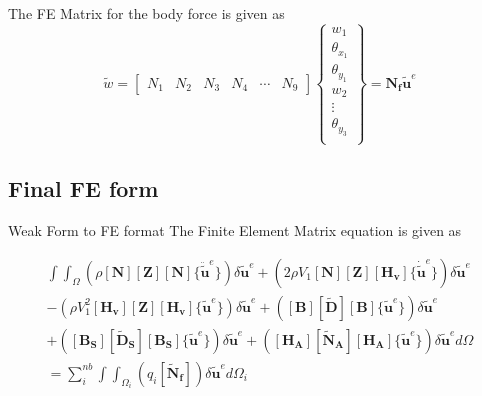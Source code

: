 \documentclass[main.tex]{subfiles}
\begin{document}
The FE Matrix for the body force is given as
\begin{equation}
\tilde{w} = 
\begin{bmatrix}
{N}_{1} & N_{2} & N_{3} &{N}_{4} &\cdots & N_{9} 
\end{bmatrix} 
\left\{
\begin{array}{r}
w_1 \\
\theta_{x_1} \\
\theta_{y_1} \\
w_2 \\
\vdots \\
\theta_{y_{3}} \\
\end{array} \right\}=\mathbf{ N_f }\tilde{\mathbf{u}}^e
\end{equation}


\subsection{Final FE form}
Weak Form to FE format
The Finite Element Matrix equation is given as

\begin{equation*}
\begin{split} 
\int \int_\Omega 
\left(
\rho
\left[ \mathbf{N}  \right]
\left[ \mathbf{Z}  \right]
\left[ \mathbf{N}  \right] 
\{ \ddot{\tilde{\mathbf{u}}}^e \}
\right) 
\delta \tilde{\mathbf{u}}^e
+
\left( 
2 \rho V_1
\left[ \mathbf{N}  \right]
\left[ \mathbf{Z}  \right]
\left[ \mathbf{H_v}  \right] 
\{ \dot{\tilde{\mathbf{u}}}^e \}
\right) 
\delta \tilde{\mathbf{u}}^e \\
-
\left( 
 \rho V_1^2
\left[ \mathbf{H_v}  \right]
\left[ \mathbf{Z}  \right]
\left[ \mathbf{H_v}  \right] 
\{\tilde{\mathbf{u}}^e \}
\right) 
\delta \tilde{\mathbf{u}}^e  
+
\left( 
\left[ \mathbf{B}  \right]
\left[ \mathbf{\tilde{D}}  \right]
\left[ \mathbf{B}  \right] 
\{\tilde{\mathbf{u}}^e \}
\right) 
\delta \tilde{\mathbf{u}}^e  \\
+
\left( 
\left[ \mathbf{B_S}  \right]
\left[ \mathbf{\tilde{D}_S}  \right]
\left[ \mathbf{B_S}  \right] 
\{\tilde{\mathbf{u}}^e \}
\right) 
\delta \tilde{\mathbf{u}}^e
+
\left( 
\left[ \mathbf{H_A}  \right]
\left[ \mathbf{\tilde{N}_A}  \right]
\left[ \mathbf{H_A}  \right] 
\{\tilde{\mathbf{u}}^e \}
\right) 
\delta \tilde{\mathbf{u}}^e
d \Omega
   \\
 =   
 \sum_i^{nb}   \int  \int_{\Omega_i} 
\left(  
 q_i 
\left[ \mathbf{\tilde{N}_f}  \right] 
\right)  
\delta \tilde{\mathbf{u}}^e
  d \Omega_i  
\end{split} 
\end{equation*}
\end{document}
